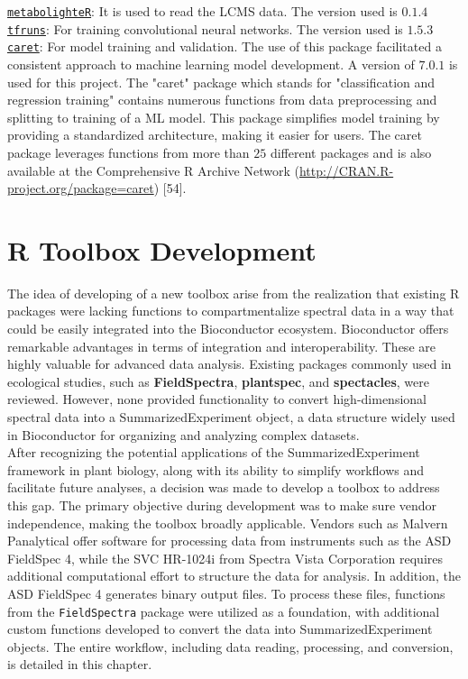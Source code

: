 \documentclass[12pt,a4paper]{report}
\begin{document}
\texttt{\href{https://github.com/aberHRML/metabolighteR}{metabolighteR}}: It is used to read the LCMS data. The version used is $0.1.4$ \\

\texttt{\href{https://github.com/rstudio/tfruns}{tfruns}}: For training convolutional neural networks. The version used is $1.5.3$ \\

\texttt{\href{https://topepo.github.io/caret/}{caret}}: For model training and validation. The use of this package facilitated a consistent approach to machine learning model development. A version of $7.0.1$ is used for this project. The "caret" package which stands for "classification and regression training" contains numerous functions from data preprocessing and  splitting to training of a ML model. This package simplifies model training by providing a standardized architecture, making it easier for users. The caret package leverages functions from more than $25$ different packages and is also available at the Comprehensive R Archive Network (\url{http://CRAN.R-project.org/package=caret}) [54]. \\



\section{R Toolbox Development}
The idea of developing of a new toolbox arise from the realization that existing R packages were lacking functions to compartmentalize spectral data in a way that could be easily integrated into the Bioconductor ecosystem. Bioconductor offers remarkable advantages in terms of integration and interoperability. These are highly valuable for advanced data analysis. 
Existing packages commonly used in ecological studies, such as \textbf{FieldSpectra}, \textbf{plantspec}, and \textbf{spectacles}, were reviewed. However, none provided functionality to convert high-dimensional spectral data into a SummarizedExperiment object, a data structure widely used in Bioconductor for organizing and analyzing complex datasets. \\

After recognizing the potential applications of the SummarizedExperiment framework in plant biology, along with its ability to simplify workflows and facilitate future analyses, a decision was made to develop a toolbox to address this gap. The primary objective during development was to make sure vendor independence, making the toolbox broadly applicable. Vendors 
such as Malvern Panalytical offer software for processing data from instruments such as the ASD FieldSpec 4, while the SVC HR-1024i from Spectra Vista Corporation requires additional computational effort to structure the data for analysis.
In addition, the ASD FieldSpec 4 generates binary output files. To process these files, functions from the \texttt{FieldSpectra} package were utilized as a foundation, with additional custom functions developed to convert the data into SummarizedExperiment objects. The entire workflow, including data reading, processing, and conversion, is detailed in this chapter.\\
\end{document}
